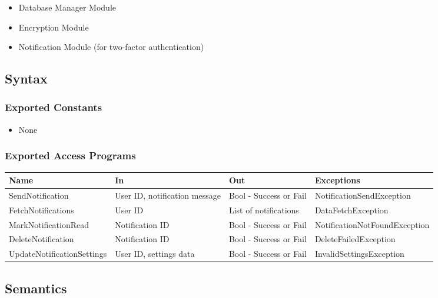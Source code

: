 \documentclass[12pt, titlepage]{article}
\begin{document}
\begin{itemize}
    \item Database Manager Module
    \item Encryption Module
    \item Notification Module (for two-factor authentication)
\end{itemize}

\subsection{Syntax}

\subsubsection{Exported Constants}

\begin{itemize}
    \item None
\end{itemize}

\subsubsection{Exported Access Programs}

\begin{center}
\begin{tabular}{p{5cm} p{3cm} p{3cm} p{5cm}}
\hline
\textbf{Name} & \textbf{In} & \textbf{Out} & \textbf{Exceptions} \\
\hline
SendNotification & User ID, notification message & Bool - Success or Fail & NotificationSendException \\
\hline
FetchNotifications & User ID & List of notifications & DataFetchException \\
\hline
MarkNotificationRead & Notification ID & Bool - Success or Fail & NotificationNotFoundException \\
\hline
DeleteNotification & Notification ID & Bool - Success or Fail & DeleteFailedException \\
\hline
UpdateNotificationSettings & User ID, settings data & Bool - Success or Fail & InvalidSettingsException \\
\hline
\end{tabular}
\end{center}

\subsection{Semantics}
\end{document}
